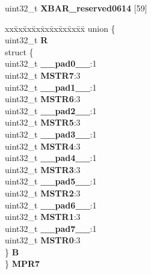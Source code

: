 \begin{DoxyCompactItemize}
\begin{tabbing}
\end{tabbing}\item 
\mbox{\label{structXBAR__tag_aa5d7b90e4e46d2b9947319f3cb08917b}} 
uint32\+\_\+t {\bfseries X\+B\+A\+R\+\_\+reserved0614} \mbox{[}59\mbox{]}
\item 
\mbox{\label{structXBAR__tag_ab6a87002042a9cf63bee90ec36b1c91c}} 
\begin{tabbing}
xx\=xx\=xx\=xx\=xx\=xx\=xx\=xx\=xx\=\kill
union \{\\
\>uint32\_t {\bfseries R}\\
\>struct \{\\
\>\>uint32\_t {\bfseries \_\_pad0\_\_}:1\\
\>\>uint32\_t {\bfseries MSTR7}:3\\
\>\>uint32\_t {\bfseries \_\_pad1\_\_}:1\\
\>\>uint32\_t {\bfseries MSTR6}:3\\
\>\>uint32\_t {\bfseries \_\_pad2\_\_}:1\\
\>\>uint32\_t {\bfseries MSTR5}:3\\
\>\>uint32\_t {\bfseries \_\_pad3\_\_}:1\\
\>\>uint32\_t {\bfseries MSTR4}:3\\
\>\>uint32\_t {\bfseries \_\_pad4\_\_}:1\\
\>\>uint32\_t {\bfseries MSTR3}:3\\
\>\>uint32\_t {\bfseries \_\_pad5\_\_}:1\\
\>\>uint32\_t {\bfseries MSTR2}:3\\
\>\>uint32\_t {\bfseries \_\_pad6\_\_}:1\\
\>\>uint32\_t {\bfseries MSTR1}:3\\
\>\>uint32\_t {\bfseries \_\_pad7\_\_}:1\\
\>\>uint32\_t {\bfseries MSTR0}:3\\
\>\} {\bfseries B}\\
\} {\bfseries MPR7}\\


\end{tabbing}
\end{DoxyCompactItemize}
